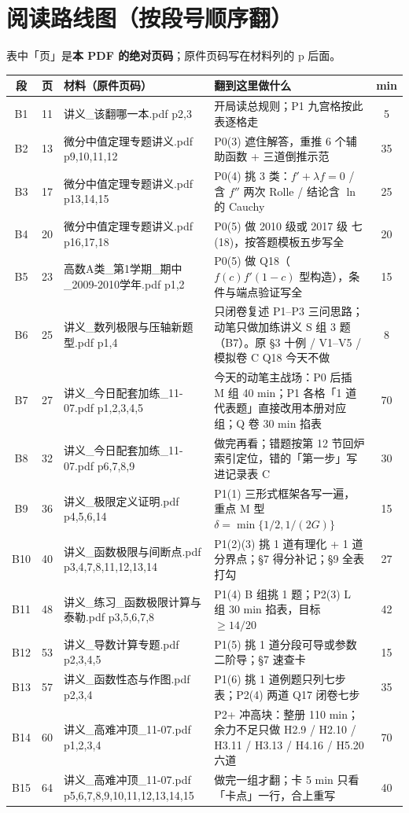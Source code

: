 \documentclass[10pt,a4paper]{ctexart}
\begin{document}
\section*{阅读路线图（按段号顺序翻）}
{\small 表中「页」是\textbf{本 PDF 的绝对页码}；原件页码写在材料列的 p 后面。}
\small
\setlength{\tabcolsep}{3pt}
\begin{longtable}{c|c|p{4.5cm}|p{6.6cm}|c}
\toprule
段 & 页 & 材料（原件页码） & 翻到这里做什么 & min \\
\midrule
\endhead
B1 & 11 & 讲义\_该翻哪一本.pdf p2,3 & 开局读总规则；P1 九宫格按此表逐格走 & 5 \\
B2 & 13 & 微分中值定理专题讲义.pdf p9,10,11,12 & P0(3) 遮住解答，重推 6 个辅助函数 + 三道倒推示范 & 35 \\
B3 & 17 & 微分中值定理专题讲义.pdf p13,14,15 & P0(4) 挑 3 类：$f'+\lambda f=0$ / 含 $f''$ 两次 Rolle / 结论含 $\ln$ 的 Cauchy & 25 \\
B4 & 20 & 微分中值定理专题讲义.pdf p16,17,18 & P0(5) 做 2010 级或 2017 级 七(18)，按答题模板五步写全 & 20 \\
B5 & 23 & 高数A类\_第1学期\_期中\_2009-2010学年.pdf p1,2 & P0(5) 做 Q18（$f(c)f'(1-c)$ 型构造），条件与端点验证写全 & 15 \\
B6 & 25 & 讲义\_数列极限与压轴新题型.pdf p1,4 & 只闭卷复述 P1--P3 三问思路；动笔只做加练讲义 S 组 3 题（B7）。原 §3 十例 / V1--V5 / 模拟卷 C Q18 今天不做 & 8 \\
B7 & 27 & 讲义\_今日配套加练\_11-07.pdf p1,2,3,4,5 & 今天的动笔主战场：P0 后插 M 组 40 min；P1 各格「1 道代表题」直接改用本册对应组；Q 卷 30 min 掐表 & 70 \\
B8 & 32 & 讲义\_今日配套加练\_11-07.pdf p6,7,8,9 & 做完再看；错题按第 12 节回炉索引定位，错的「第一步」写进记录表 C & 30 \\
B9 & 36 & 讲义\_极限定义证明.pdf p4,5,6,14 & P1(1) 三形式框架各写一遍，重点 M 型 $\delta=\min\{1/2,1/(2G)\}$ & 15 \\
B10 & 40 & 讲义\_函数极限与间断点.pdf p3,4,7,8,11,12,13,14 & P1(2)(3) 挑 1 道有理化 + 1 道分界点；§7 得分补记；§9 全表打勾 & 27 \\
B11 & 48 & 讲义\_练习\_函数极限计算与泰勒.pdf p3,5,6,7,8 & P1(4) B 组挑 1 题；P2(3) L 组 30 min 掐表，目标 $\geq 14/20$ & 42 \\
B12 & 53 & 讲义\_导数计算专题.pdf p2,3,4,5 & P1(5) 挑 1 道分段可导或参数二阶导；§7 速查卡 & 15 \\
B13 & 57 & 讲义\_函数性态与作图.pdf p2,3,4 & P1(6) 挑 1 道例题只列七步表；P2(4) 两道 Q17 闭卷七步 & 35 \\
B14 & 60 & 讲义\_高难冲顶\_11-07.pdf p1,2,3,4 & P2+ 冲高块：整册 110 min；余力不足只做 H2.9 / H2.10 / H3.11 / H3.13 / H4.16 / H5.20 六道 & 70 \\
B15 & 64 & 讲义\_高难冲顶\_11-07.pdf p5,6,7,8,9,10,11,12,13,14,15 & 做完一组才翻；卡 5 min 只看「卡点」一行，合上重写 & 40 \\
\bottomrule
\end{longtable}
\end{document}
